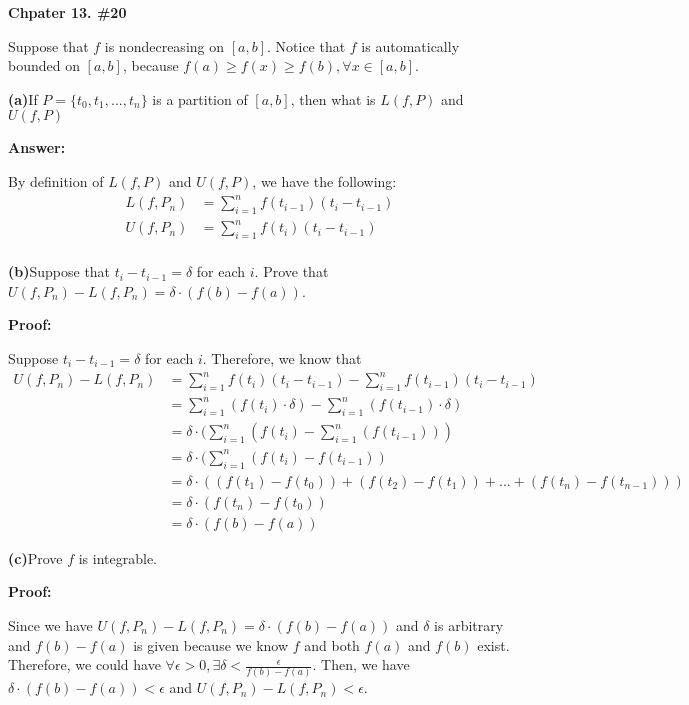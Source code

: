 \documentclass[a4paper,12pt]{report}
\begin{document}
\noindent
\textbf{Chpater 13. \#20}

\noindent
Suppose that $f$ is nondecreasing on $[a,b]$. Notice that $f$ is automatically bounded on $[a,b]$, because $f(a)\geq f(x)\geq f(b), \forall x\in [a,b]$.

\noindent
\textbf{(a)}If $P=\{t_0,t_1,...,t_n\}$ is a partition of $[a,b]$, then what is $L(f,P)$ and $U(f,P)$

\noindent
\textbf{Answer: }

\noindent
By definition of $L(f,P)$ and $U(f,P)$, we have the following:
\begin{align*}
L(f,P_n)&=\sum_{i=1}^{n}f(t_{i-1})(t_i-t_{i-1})\\
U(f,P_n)&=\sum_{i=1}^{n}f(t_{i})(t_i-t_{i-1})\\
\end{align*}

\noindent
\textbf{(b)}Suppose that $t_{i}-t_{i-1}=\delta$ for each $i$. Prove that $U(f,P_n)-L(f,P_n)=\delta\cdot(f(b)-f(a))$.

\noindent
\textbf{Proof: }

\noindent
Suppose $t_{i}-t_{i-1}=\delta$ for each $i$. Therefore, we know that 
\begin{align*}
U(f,P_n)-L(f,P_n)&=\sum_{i=1}^{n}f(t_{i})(t_i-t_{i-1})-\sum_{i=1}^{n}f(t_{i-1})(t_i-t_{i-1})\\
&=\sum_{i=1}^{n}(f(t_{i})\cdot{\delta})-\sum_{i=1}^{n}(f(t_{i-1})\cdot{\delta})\\
&=\delta\cdot{(\sum_{i=1}^{n}(f(t_{i})-\sum_{i=1}^{n}(f(t_{i-1})))}\\
&=\delta\cdot{(\sum_{i=1}^{n}(f(t_{i})-f(t_{i-1}))}\\
&=\delta\cdot{((f(t_1)-f(t_0))+(f(t_2)-f(t_1))+...+(f(t_n)-f(t_{n-1})))}\\
&=\delta\cdot{(f(t_n)-f(t_0))}\\
&=\delta\cdot{(f(b)-f(a))}
\end{align*}
 
\noindent
\textbf{(c)}Prove $f$ is integrable.

\noindent
\textbf{Proof: }

\noindent
Since we have $U(f,P_n)-L(f,P_n)=\delta\cdot{(f(b)-f(a))}$ and $\delta$ is arbitrary and $f(b)-f(a)$ is given because we know $f$ and both $f(a)$ and $f(b)$ exist. Therefore, we could have $\forall \epsilon>0, \exists \delta<\frac{\epsilon}{f(b)-f(a)}$. Then, we have $\delta\cdot{(f(b)-f(a))}<\epsilon$ and $U(f,P_n)-L(f,P_n)<\epsilon$. \\
\end{document}
